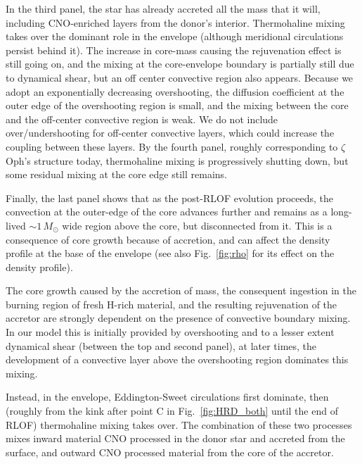 \documentclass[twocolumn,twocolappendix,trackchanges]{aastex63}
\DeclareRobustCommand{\Figref}[1]{Fig.~\ref{#1}}
\newcommand{\zoph}{$\zeta$ Oph}
\begin{document}
In the third panel, the star has already accreted all the mass that it will, including CNO-enriched layers from the donor's interior. Thermohaline mixing takes over the dominant role in the envelope (although meridional circulations persist behind it). The increase in core-mass causing the rejuvenation effect is still going on, and the mixing at the core-envelope boundary is partially still due to dynamical shear, but an off center convective region also appears. Because we adopt an exponentially decreasing overshooting, the diffusion coefficient at the outer edge of the overshooting region is small, and the mixing between the core and the off-center convective region is weak. We do not include over/undershooting for off-center convective layers, which could increase the coupling between these layers. By the fourth panel, roughly corresponding to \zoph's structure today, thermohaline mixing is progressively shutting down, but some residual mixing at the core edge still remains.



Finally, the last panel shows that as the post-RLOF evolution
proceeds, the convection at the outer-edge of the core advances
further and remains as a long-lived
$\sim$$1\,M_\odot$ wide region above the core, but disconnected from it. This is a consequence of core growth because of accretion, and can affect the density profile at the base of the envelope (see
also \Figref{fig:rho} for its effect on the density profile).

The core growth caused by the accretion of mass, the
consequent ingestion in the burning region of fresh H-rich material, and the
resulting rejuvenation of the accretor are strongly dependent on the presence of
convective boundary mixing. In our model this is initially provided by
overshooting and to a lesser extent dynamical shear (between the top
and second panel), at later times, the development of a convective
layer above the overshooting region dominates this mixing.

Instead, in the envelope, Eddington-Sweet circulations first dominate,
then (roughly from the kink after point C in \Figref{fig:HRD_both}
until the end of RLOF) thermohaline mixing takes over. The combination
of these two processes mixes inward material CNO processed in the
donor star and accreted from the surface, and outward CNO processed
material from the core of the accretor.
\end{document}
